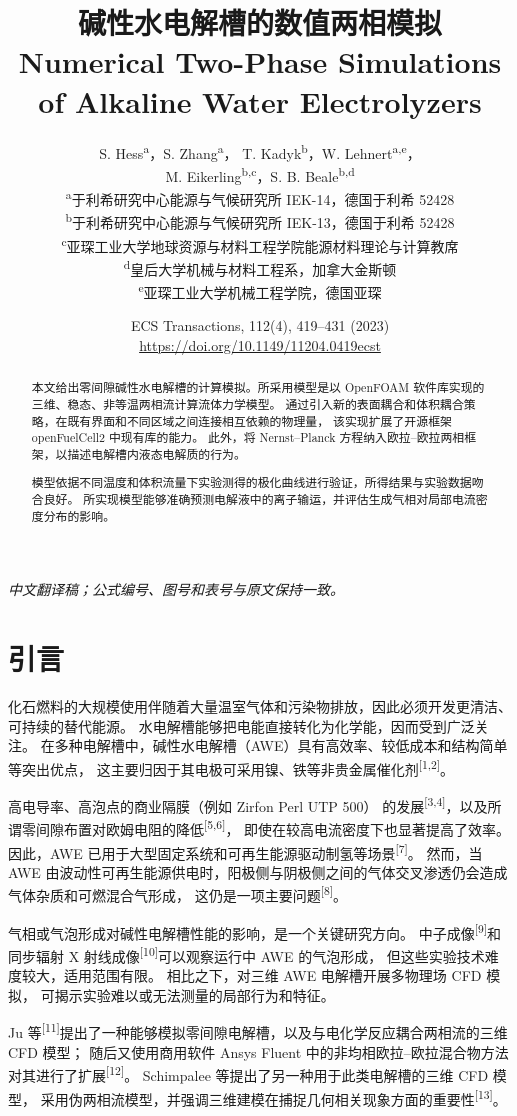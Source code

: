 \documentclass[UTF8,zihao=-4,fontset=fandol]{ctexart}
\title{\bfseries 碱性水电解槽的数值两相模拟\\
\large Numerical Two-Phase Simulations of Alkaline Water Electrolyzers}
\author{S. Hess\textsuperscript{a}，S. Zhang\textsuperscript{a}，
T. Kadyk\textsuperscript{b}，W. Lehnert\textsuperscript{a,e}，\\
M. Eikerling\textsuperscript{b,c}，S. B. Beale\textsuperscript{b,d}\\[0.7em]
\small\textsuperscript{a}于利希研究中心能源与气候研究所 IEK-14，德国于利希 52428\\
\small\textsuperscript{b}于利希研究中心能源与气候研究所 IEK-13，德国于利希 52428\\
\small\textsuperscript{c}亚琛工业大学地球资源与材料工程学院能源材料理论与计算教席\\
\small\textsuperscript{d}皇后大学机械与材料工程系，加拿大金斯顿\\
\small\textsuperscript{e}亚琛工业大学机械工程学院，德国亚琛}
\date{\small ECS Transactions, 112(4), 419--431 (2023)\\
\url{https://doi.org/10.1149/11204.0419ecst}}
\begin{document}
\maketitle
\thispagestyle{empty}
\begin{center}\small\itshape 中文翻译稿；公式编号、图号和表号与原文保持一致。\end{center}

\begin{abstract}
本文给出零间隙碱性水电解槽的计算模拟。所采用模型是以 OpenFOAM 软件库实现的三维、稳态、非等温两相流计算流体力学模型。
通过引入新的表面耦合和体积耦合策略，在既有界面和不同区域之间连接相互依赖的物理量，
该实现扩展了开源框架 openFuelCell2 中现有库的能力。
此外，将 Nernst--Planck 方程纳入欧拉--欧拉两相框架，以描述电解槽内液态电解质的行为。

模型依据不同温度和体积流量下实验测得的极化曲线进行验证，所得结果与实验数据吻合良好。
所实现模型能够准确预测电解液中的离子输运，并评估生成气相对局部电流密度分布的影响。
\end{abstract}

\section{引言}

化石燃料的大规模使用伴随着大量温室气体和污染物排放，因此必须开发更清洁、可持续的替代能源。
水电解槽能够把电能直接转化为化学能，因而受到广泛关注。
在多种电解槽中，碱性水电解槽（AWE）具有高效率、较低成本和结构简单等突出优点，
这主要归因于其电极可采用镍、铁等非贵金属催化剂\textsuperscript{[1,2]}。

高电导率、高泡点的商业隔膜（例如 Zirfon\textsuperscript{\textregistered} Perl UTP 500）
的发展\textsuperscript{[3,4]}，以及所谓零间隙布置对欧姆电阻的降低\textsuperscript{[5,6]}，
即使在较高电流密度下也显著提高了效率。
因此，AWE 已用于大型固定系统和可再生能源驱动制氢等场景\textsuperscript{[7]}。
然而，当 AWE 由波动性可再生能源供电时，阳极侧与阴极侧之间的气体交叉渗透仍会造成气体杂质和可燃混合气形成，
这仍是一项主要问题\textsuperscript{[8]}。

气相或气泡形成对碱性电解槽性能的影响，是一个关键研究方向。
中子成像\textsuperscript{[9]}和同步辐射 X 射线成像\textsuperscript{[10]}可以观察运行中 AWE 的气泡形成，
但这些实验技术难度较大，适用范围有限。
相比之下，对三维 AWE 电解槽开展多物理场 CFD 模拟，
可揭示实验难以或无法测量的局部行为和特征。

Ju 等\textsuperscript{[11]}提出了一种能够模拟零间隙电解槽，以及与电化学反应耦合两相流的三维 CFD 模型；
随后又使用商用软件 Ansys Fluent 中的非均相欧拉--欧拉混合物方法对其进行了扩展\textsuperscript{[12]}。
Schimpalee 等提出了另一种用于此类电解槽的三维 CFD 模型，
采用伪两相流模型，并强调三维建模在捕捉几何相关现象方面的重要性\textsuperscript{[13]}。
\end{document}
